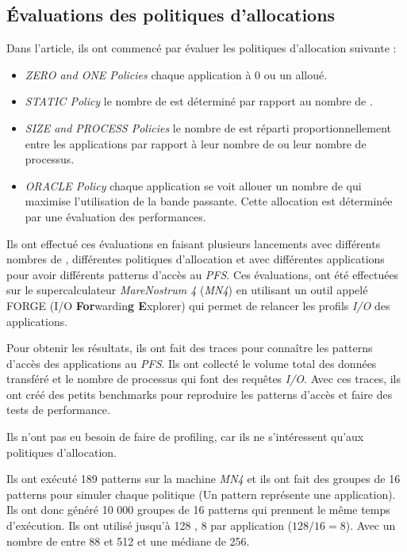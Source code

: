 \documentclass[10pt, a4paper]{article}
\begin{document}
\subsection{Évaluations des politiques d'allocations}

Dans l'article, ils ont commencé par évaluer les politiques d'allocation suivante :
\begin{itemize}
  \item \emph{ZERO and ONE Policies} chaque application à 0 ou un \noeudIO{} alloué.
  \item \emph{STATIC Policy} le nombre de \noeudsIO est déterminé par rapport au nombre de \noeudsDeCalculs{}.
  \item \emph{SIZE and PROCESS Policies} le nombre de \noeudsIO est réparti proportionnellement entre les applications par rapport à leur nombre de \noeudsDeCalculs{} ou leur nombre de processus.
  \item \emph{ORACLE Policy} chaque application se voit allouer un nombre de \noeudsIO qui maximise l'utilisation de la bande passante. Cette allocation est déterminée par une évaluation des performances.
\end{itemize}

Ils ont effectué ces évaluations en faisant plusieurs lancements avec différents nombres de \noeudsIO, différentes politiques d'allocation et avec différentes applications pour avoir différents patterns d'accès au \emph{PFS}. Ces évaluations, ont été effectuées sur le supercalculateur \emph{MareNostrum 4} (\emph{MN4}) en utilisant un outil appelé FORGE (I/O \textbf{For}wardin\textbf{g E}xplorer) qui permet de relancer les profils \emph{I/O} des applications.

Pour obtenir les résultats, ils ont fait des traces pour connaître les patterns d'accès des applications au \emph{PFS}. Ils ont collecté le volume total des données transféré et le nombre de processus qui font des requêtes \emph{I/O}. Avec ces traces, ils ont créé des petits benchmarks pour reproduire les patterns d'accès et faire des tests de performance.

Ils n'ont pas eu besoin de faire de profiling, car ils ne s'intéressent qu'aux politiques d'allocation.

Ils ont exécuté 189 patterns sur la machine \emph{MN4} et ils ont fait des groupes de 16 patterns pour simuler chaque politique (Un pattern représente une application).
Ils ont donc généré 10 000 groupes de 16 patterns qui prennent le même temps d'exécution.
Ils ont utilisé jusqu'à 128 \noeudsIOforwarding{}, 8 par application ($128/16=8$). Avec un nombre de \noeudsDeCalculs{} entre 88 et 512 et une médiane de 256.
\end{document}
